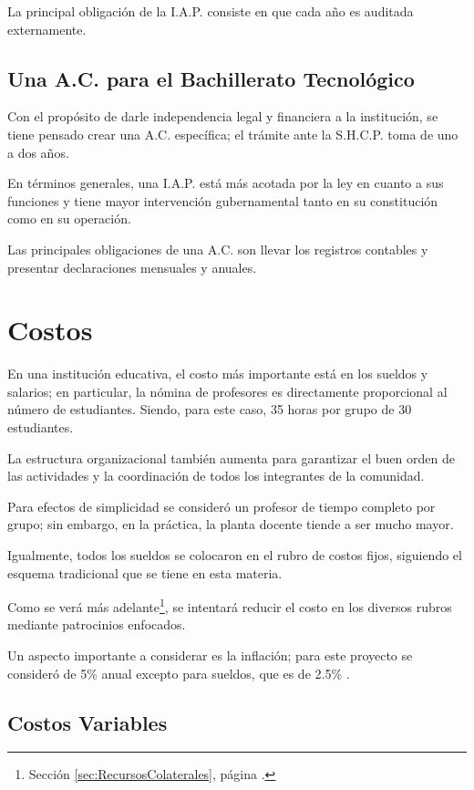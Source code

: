 La principal obligación de la I.A.P. consiste en que cada año es auditada externamente.

\subsection{Una A.C. para el Bachillerato Tecnológico}

Con el propósito de darle independencia legal y financiera a la institución, se tiene pensado crear una A.C. específica; el trámite ante la S.H.C.P. toma de uno a dos años.

En términos generales, una I.A.P. está más acotada por la ley en cuanto a sus funciones y tiene mayor intervención gubernamental tanto en su constitución como en su operación.

Las principales obligaciones de una A.C. son llevar los registros contables y presentar declaraciones mensuales y anuales.

\section{Costos}
\label{sec:Costos}

En una institución educativa, el costo más importante está en los sueldos y salarios; en particular, la nómina de profesores es directamente proporcional al número de estudiantes. Siendo, para este caso, 35 horas por grupo de 30 estudiantes.

La estructura organizacional también aumenta para garantizar el buen orden de las actividades y la coordinación de todos los integrantes de la comunidad.

Para efectos de simplicidad se consideró un profesor de tiempo completo por grupo; sin embargo, en la práctica, la planta docente tiende a ser mucho mayor.

Igualmente, todos los sueldos se colocaron en el rubro de costos fijos, siguiendo el esquema tradicional que se tiene en esta materia.

Como se verá más adelante\footnote{Sección \ref{sec:RecursosColaterales}, página \pageref{sec:RecursosColaterales}.}, se intentará reducir el costo en los diversos rubros mediante patrocinios enfocados.

Un aspecto importante a considerar es la inflación; para este proyecto se consideró de 5\% anual excepto para sueldos, que es de 2.5\% \citep{BANXICO}.

\subsection{Costos Variables}

